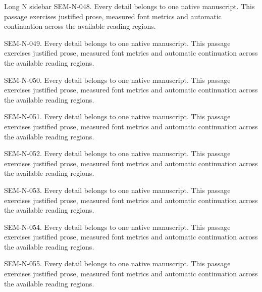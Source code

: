 \begin{m20sidebar}[id=long-narrow]{Long N sidebar}
SEM-N-048. Every detail belongs to one native manuscript. This passage exercises justified prose, measured font metrics and automatic continuation across the available reading regions.\par
SEM-N-049. Every detail belongs to one native manuscript. This passage exercises justified prose, measured font metrics and automatic continuation across the available reading regions.\par
SEM-N-050. Every detail belongs to one native manuscript. This passage exercises justified prose, measured font metrics and automatic continuation across the available reading regions.\par
SEM-N-051. Every detail belongs to one native manuscript. This passage exercises justified prose, measured font metrics and automatic continuation across the available reading regions.\par
SEM-N-052. Every detail belongs to one native manuscript. This passage exercises justified prose, measured font metrics and automatic continuation across the available reading regions.\par
SEM-N-053. Every detail belongs to one native manuscript. This passage exercises justified prose, measured font metrics and automatic continuation across the available reading regions.\par
SEM-N-054. Every detail belongs to one native manuscript. This passage exercises justified prose, measured font metrics and automatic continuation across the available reading regions.\par
SEM-N-055. Every detail belongs to one native manuscript. This passage exercises justified prose, measured font metrics and automatic continuation across the available reading regions.\par
\end{m20sidebar}
